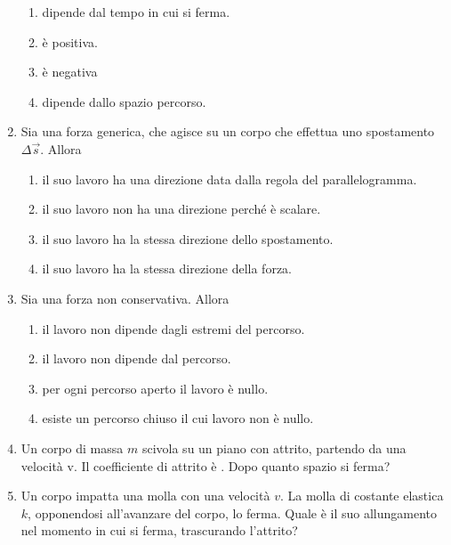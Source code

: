 \documentclass{article}
\begin{document}
\begin{enumerate}
  \begin{enumerate}[label=\Alph*.]
    \item dipende dal tempo in cui si ferma.
    \item è positiva.
    \item è negativa
    \item dipende dallo spazio percorso.
  \end{enumerate}
  \item Sia  una forza generica, che agisce su un corpo che effettua uno spostamento $\Delta \vec{s}$. Allora
  \begin{enumerate}[label=\Alph*.]
    \item il suo lavoro ha una direzione data dalla regola del parallelogramma.
    \item il suo lavoro non ha una direzione perché è scalare.
    \item il suo lavoro ha la stessa direzione dello spostamento.
    \item il suo lavoro ha la stessa direzione della forza.
  \end{enumerate}
  \item Sia  una forza non conservativa. Allora
  \begin{enumerate}[label=\Alph*.]
    \item il lavoro non dipende dagli estremi del percorso.
    \item il lavoro non dipende dal percorso.
    \item per ogni percorso aperto il lavoro è nullo.
    \item esiste un percorso chiuso il cui lavoro non è nullo.
  \end{enumerate}
  \item Un corpo di massa $m$ scivola su un piano con attrito, partendo da una velocità v. Il coefficiente di attrito è \mu. Dopo quanto spazio si ferma?
  \begin{enumerate}[label=\Alph*.]
    \item $\frac{1}{2}v^2-\mu g$.
    \item $\frac{v^2}{2g\mu}}$.
    \item $\frac{2v^2}{g\mu}}$.
    \item $\frac{1}{2}v^2+\mu g$.
  \end{enumerate}
  \item Un corpo impatta una molla con una velocità $v$. La molla di costante elastica $k$, opponendosi all'avanzare del corpo, lo ferma. Quale è il suo allungamento nel momento in cui si ferma, trascurando l'attrito?

\end{enumerate}
\end{document}
